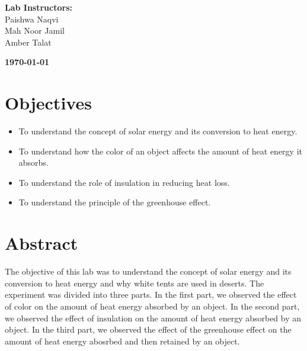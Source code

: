 \documentclass[a4paper, 12pt, english]{article}
\begin{document}
\begin{titlepage}
\begin{center}
		\vspace{45pt}
		\textbf {\large Lab Instructors:}\\[0.2cm]
		\Large {Paishwa Naqvi}\\[0.1cm]
		\Large {Mah Noor Jamil}\\[0.1cm]
		\Large {Amber Talat}\\[0.1cm]
	\end{center}

	\par
	\vfill
	\begin{center}
		\textbf{\today}\\
	\end{center}

\end{titlepage}



\newpage
\section{Objectives}
\begin{itemize}
	\item To understand the concept of solar energy and its conversion to heat energy.
	\item To understand how the color of an object affects the amount of heat energy it
	      absorbs.
	\item To understand the role of insulation in reducing heat loss.
	\item To understand the principle of the greenhouse effect.
\end{itemize}

\section{Abstract}
The objective of this lab was to understand the concept of solar energy and its
conversion to heat energy and why white tents are used in deserts. The
experiment was divided into three parts. In the first part, we observed the
effect of color on the amount of heat energy absorbed by an object. In the
second part, we observed the effect of insulation on the amount of heat energy
absorbed by an object. In the third part, we observed the effect of the
greenhouse effect on the amount of heat energy abosrbed and then retained by an
object.
\end{document}
